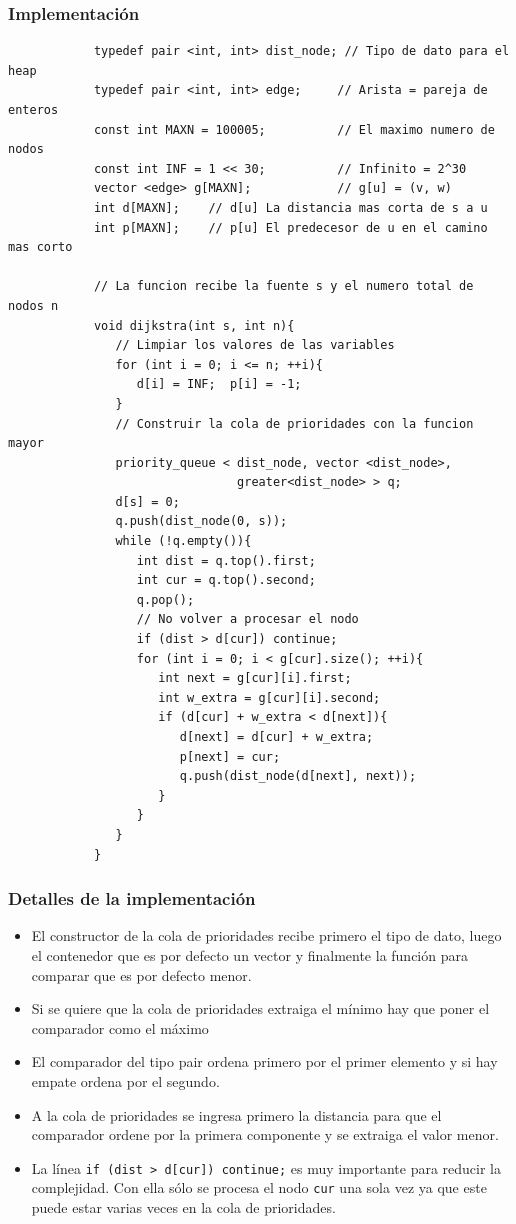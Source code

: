 \documentclass{beamer}
\begin{document}
	\begin{frame}
		\frametitle{Implementación}
		\begin{lstlisting}
			typedef pair <int, int> dist_node; // Tipo de dato para el heap
			typedef pair <int, int> edge;     // Arista = pareja de enteros
			const int MAXN = 100005;          // El maximo numero de nodos
			const int INF = 1 << 30;          // Infinito = 2^30
			vector <edge> g[MAXN];            // g[u] = (v, w)
			int d[MAXN];    // d[u] La distancia mas corta de s a u
			int p[MAXN];    // p[u] El predecesor de u en el camino mas corto

			// La funcion recibe la fuente s y el numero total de nodos n
			void dijkstra(int s, int n){
			   // Limpiar los valores de las variables
			   for (int i = 0; i <= n; ++i){
			      d[i] = INF;  p[i] = -1;
			   }
			   // Construir la cola de prioridades con la funcion mayor
			   priority_queue < dist_node, vector <dist_node>, 
			                    greater<dist_node> > q;
			   d[s] = 0;
			   q.push(dist_node(0, s));
			   while (!q.empty()){
			      int dist = q.top().first;
			      int cur = q.top().second;
			      q.pop();
			      // No volver a procesar el nodo
			      if (dist > d[cur]) continue;
			      for (int i = 0; i < g[cur].size(); ++i){
			         int next = g[cur][i].first;
			         int w_extra = g[cur][i].second;
			         if (d[cur] + w_extra < d[next]){
			            d[next] = d[cur] + w_extra;
			            p[next] = cur;
			            q.push(dist_node(d[next], next));
			         }
			      }
			   }  
			}
		\end{lstlisting}
	\end{frame}
	
	\begin{frame}[fragile]
		\frametitle{Detalles de la implementación}
		\begin{itemize}
			\item El constructor de la cola de prioridades recibe primero el tipo de dato, luego el contenedor que es por defecto un vector y finalmente la función para comparar que es por defecto menor.
			\item Si se quiere que la cola de prioridades extraiga el mínimo hay que poner el comparador como el máximo
			\item El comparador del tipo pair ordena primero por el primer elemento y si hay empate ordena por el segundo.
			\item A la cola de prioridades se ingresa primero la distancia para que el comparador ordene por la primera componente y se extraiga el valor menor.
			\item La línea \verb|if (dist > d[cur]) continue;| es muy importante para reducir la complejidad. Con ella sólo se procesa el nodo \verb|cur| una sola vez ya que este puede estar varias veces en la cola de prioridades.
		\end{itemize}
	\end{frame}
	
\end{document}
